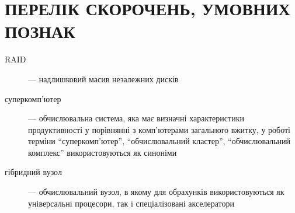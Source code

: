 \chapter{ПЕРЕЛІК СКОРОЧЕНЬ, УМОВНИХ ПОЗНАК}
\begin{description}
\item[RAID] --- надлишковий масив незалежних дисків
\item[суперкомп'ютер] --- обчислювальна система, яка має визначні характеристики продуктивності у порівнянні з комп'ютерами загального вжитку, у роботі терміни ``суперкомп'ютер'', ``обчислювальний кластер'', ``обчислювальний комплекс'' використовуються як синоніми
\item[гібридний вузол] --- обчислювальний вузол, в якому для обрахунків використовуються як універсальні процесори, так і спеціалізовані акселератори
\end{description}